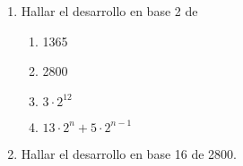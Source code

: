 
\begin{enunciado}{\ejercicio}
        \begin{enumerate}[label=(\alph*)]
    \item Hallar el desarrollo en base 2 de
          \begin{multicols}{4}
            \begin{enumerate}[label=\roman*.]
              \item 1365
              \item 2800
              \item $3\cdot 2^{12}$
              \item $13 \cdot 2^n + 5 \cdot 2^{n-1}$
            \end{enumerate}
          \end{multicols}

  \item Hallar el desarrollo en base 16 de 2800.
  \end{enumerate}
\end{enunciado}
\hacer
